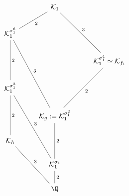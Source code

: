 \documentclass[preview]{standalone}
\newcommand{\K}{\mathcal{K}}
\begin{document}
\begin{center}
\begin{figure}
                \centering
                \[
                \begin{tikzcd}
                &\K_1 \ar[dl, "2", dash] \ar[ddr, "3", dash] & \\
                \K_1^{\sigma_1^6} \ar[dd, "2", dash] \ar[dddr, "3", dash] && \\
                & & \K_1^{\sigma_1^4} \simeq \K_{f_1} \ar[ddl, "2", dash] \\
                \K_1^{\sigma_1^3} \ar[dd, "2", dash] \ar[dddr, "3", dash]&& \\
                & \K_g := \K_1^{\sigma_1^2} \ar[dd, "2", dash] & \\
                \K_h \ar[ddr, "3", dash] && \\
                & \K_1^{\sigma_1} \ar[d, "2", dash] & \\
                & \Q &
                \end{tikzcd}
                \]
                \end{figure}
\end{center}
\end{document}

